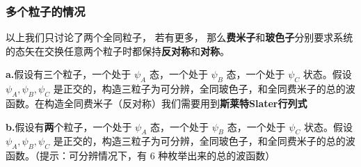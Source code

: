 \subsubsection{多个粒子的情况}
以上我们只讨论了两个全同粒子， 若有更多， 那么\textbf{费米子}和\textbf{玻色子}分别要求系统的态矢在交换任意两个粒子时都保持\textbf{反对称}和\textbf{对称}。
\begin{exercise}{}
\textbf{a.}假设有三个粒子，一个处于 $\psi_A$ 态，一个处于 $\psi_B$ 态，一个处于 $\psi_C$ 状态。假设 $\psi_A,\psi_B,\psi_C$ 是正交的，构造三粒子为可分辨，全同玻色子，和全同费米子的总的波函数。在构造全同费米子（反对称）我们需要用到\textbf{斯莱特Slater行列式}

\textbf{b.}假设有\textbf{两}个粒子，一个处于 $\psi_A$ 态，一个处于 $\psi_B$ 态，一个处于 $\psi_C$ 状态。假设 $\psi_A,\psi_B,\psi_C$ 是正交的，构造三粒子为可分辨，全同玻色子，和全同费米子的总的波函数。（提示：可分辨情况下，有 $6$ 种枚举出来的总的波函数）
\end{exercise}
